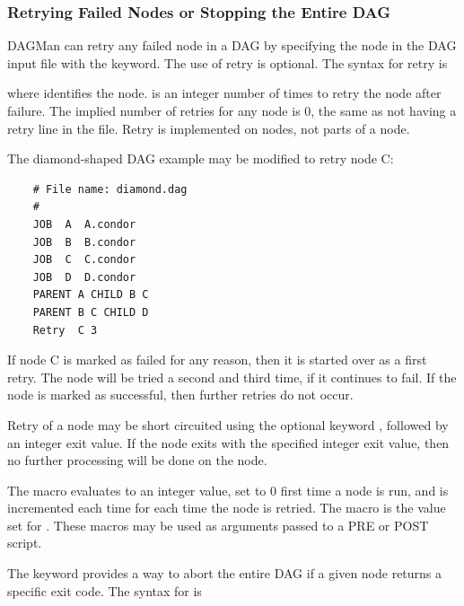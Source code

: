 \subsubsection{\label{dagman:retry}Retrying Failed Nodes or Stopping the Entire DAG}


DAGMan can retry any failed node in a DAG by
specifying the node in the DAG input file 
with the  keyword.
The use of retry is optional.
The syntax for retry is

   

where  identifies the node.
 is an integer
number of times to retry the node after failure.
The implied number of retries for any node is 0,
the same as not having a retry line in the file. 
Retry is implemented on nodes, not parts of a node.

The diamond-shaped DAG example may be modified to
retry node C:

\footnotesize
\begin{verbatim}
    # File name: diamond.dag
    #
    JOB  A  A.condor 
    JOB  B  B.condor 
    JOB  C  C.condor	
    JOB  D  D.condor
    PARENT A CHILD B C
    PARENT B C CHILD D
    Retry  C 3
\end{verbatim}
\normalsize

If node C is marked as failed for any reason,
then it is started over as a first retry.
The node will be tried a second and third time,
if it continues to fail.
If the node is marked as successful, then further retries do not occur.

Retry of a node may be short circuited using the
optional keyword , followed by an integer exit value.
If the node exits with the specified integer exit value,
then no further processing will be done
on the node. 

The macro  evaluates to an 
integer value, set to 0 first time a node is run,
and is incremented each time for each time the node is retried. 
The macro  is the value set for
.
These macros may be used as arguments passed to a PRE or POST script.


The  keyword provides a way
to abort the entire DAG if a given node returns a specific exit
code.  The syntax for  is

